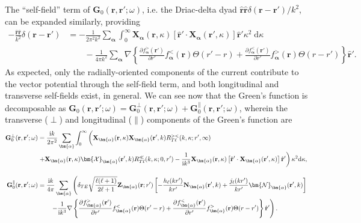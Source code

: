 The ``self-field'' term of $\mathbf{G}_0(\mathbf{r},\mathbf{r}';\omega)$, i.e. the Driac-delta dyad $\hat{\mathbf{r}}\hat{\mathbf{r}}\delta(\mathbf{r} - \mathbf{r}')/k^2$, can be expanded similarly, providing
\begin{equation}
\begin{split}
-\frac{\hat{\mathbf{r}}\hat{\mathbf{r}}}{k^2}\delta(\mathbf{r} - \mathbf{r}') &= -\frac{1}{2\pi^2k^2}\sum_{\bm{\alpha}}\int_0^\infty\mathbf{X}_{\bm{\alpha}}(\mathbf{r},\kappa)\left[\hat{\mathbf{r}}'\cdot\mathbf{X}_{\bm{\alpha}}(\mathbf{r}',\kappa)\right]\hat{\mathbf{r}}'\kappa^2\;\mathrm{d}\kappa\\
&\qquad-\frac{1}{4\pi k^2}\sum_{\bm{\alpha}}\nabla\left\{\frac{\partial f_{\bm{\alpha}}^>(\mathbf{r}')}{\partial r'}f_{\bm{\alpha}}^<(\mathbf{r})\Theta(r' - r) + \frac{\partial f_{\bm{\alpha}}^<(\mathbf{r}')}{\partial r'}f_{\bm{\alpha}}^>(\mathbf{r})\Theta(r - r')\right\}\hat{\mathbf{r}}'.
\end{split}
\end{equation}
As expected, only the radially-oriented components of the current contribute to the vector potential through the self-field term, and both longitudinal and transverse self-fields exist, in general. We can see now that the Green's function is decomposable as $\mathbf{G}_0(\mathbf{r},\mathbf{r}';\omega) = \mathbf{G}_0^\perp(\mathbf{r},\mathbf{r}';\omega) + \mathbf{G}_0^\parallel(\mathbf{r},\mathbf{r}';\omega)$, wherein the transverse ($\perp$) and longitudinal ($\parallel$) components of the Green's function are
\begin{equation}\label{eq:helmholtzDecompositionFreeSpaceGreenFunction}
\begin{split}
\mathbf{G}_0^\perp(\mathbf{r},\mathbf{r}';\omega) &= \frac{\mathrm{i}k}{2\pi^2}\sum_{\bm{\alpha}}\int_0^\infty\left( \vphantom{\frac{1}{4\pi k^2}} \mathbf{X}_{\bm{\alpha}}(\mathbf{r},\kappa)\mathbf{X}_{\bm{\alpha}}(\mathbf{r}',k)R_{T\ell}^{><}(k,\kappa;r',\infty)\right.\\
&\left.+ \mathbf{X}_{\bm{\alpha}}(\mathbf{r},\kappa)\bm{\mathcal{X}}_{\bm{\alpha}}(\mathbf{r}',k)R_{T\ell}^\ll(k,\kappa;0,r') - \frac{1}{\mathrm{i} k^3}\mathbf{X}_{\bm{\alpha}}(\mathbf{r},\kappa)\left[\hat{\mathbf{r}}'\cdot\mathbf{X}_{\bm{\alpha}}(\mathbf{r}',\kappa)\right]\hat{\mathbf{r}}'\right)\kappa^2\mathrm{d}\kappa,\\[1.0em]
\mathbf{G}_0^\parallel(\mathbf{r},\mathbf{r}';\omega) &= \frac{\mathrm{i}k}{4\pi}\sum_{\bm{\alpha}}\left(\delta_{TE}\sqrt{\frac{\ell(\ell + 1)}{2\ell + 1}}\mathbf{Z}_{\bm{\alpha}}(\mathbf{r};r')\left[-\frac{h_\ell(kr')}{kr'}\mathbf{N}_{\bm{\alpha}}(\mathbf{r}',k) + \frac{j_\ell(kr')}{kr'}\bm{\mathcal{N}}_{\bm{\alpha}}(\mathbf{r}',k)\right]\right.\\
&\left.\qquad-\frac{1}{\mathrm{i} k^3}\nabla\left\{\frac{\partial f_{\bm{\alpha}}^>(\mathbf{r}')}{\partial r'}f_{\bm{\alpha}}^<(\mathbf{r})\Theta(r' - r) + \frac{\partial f_{\bm{\alpha}}^<(\mathbf{r}')}{\partial r'}f_{\bm{\alpha}}^>(\mathbf{r})\Theta(r - r')\right\}\hat{\mathbf{r}}' \vphantom{\sqrt{\frac{\ell(\ell + 1)}{2\ell + 1}}} \right).
\end{split}
\end{equation}
